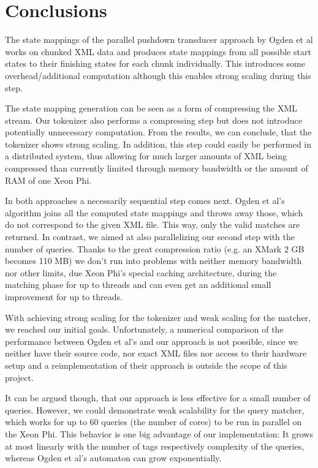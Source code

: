 \section{Conclusions}

The state mappings of the parallel pushdown transducer approach by Ogden et 
al\cite{Ogden2013}  works on chunked XML data and produces state mappings from
all possible start states to their finishing states for each chunk individually. This 
introduces some overhead/additional computation although this enables strong
scaling during this step.

The state mapping generation can be seen as a form of compressing the XML stream.
Our tokenizer also performs a compressing step but does not introduce potentially 
unnecessary computation. 
From the results, we can conclude, that the tokenizer shows strong scaling. In addition, 
this step could easily be performed in a distributed system, thus allowing for much larger 
amounts of XML being compressed than currently limited through memory bandwidth or 
the amount of RAM of one Xeon Phi.

In both approaches a necessarily sequential step comes next. Ogden et al's algorithm
joins all the computed state mappings and throws away those, which do not correspond 
to the given XML file. This way, only the valid matches are returned. 
In contrast, we aimed at also parallelizing our second step with the number of queries.
Thanks to the great compression ratio (e.g. an XMark 2 GB becomes 110 MB) we don't run into
problems with neither memory bandwidth nor other limits, due Xeon Phi's special caching
architecture,  during the matching phase for up to  threads and can even get an 
additional small improvement for up to  threads. 


With achieving strong scaling for the tokenizer and weak scaling for the matcher, we 
reached our initial goals. Unfortunately, a numerical comparison of the performance
between Ogden et al's and our approach is not possible, since we neither have their 
source code, nor exact XML files nor access to their hardware setup and a 
reimplementation of their approach is outside the scope of this project.

It can be argued though, that our approach is less effective for a small number
of queries. However, we could demonstrate weak scalability for the query matcher,
which works for up to 60 queries (the number of cores) to be run in parallel on the 
Xeon Phi. 
This behavior is one big advantage of our implementation: It grows at most linearly
with the number of tags respectively complexity of the queries, whereas Ogden et al's 
automaton can grow exponentially.

